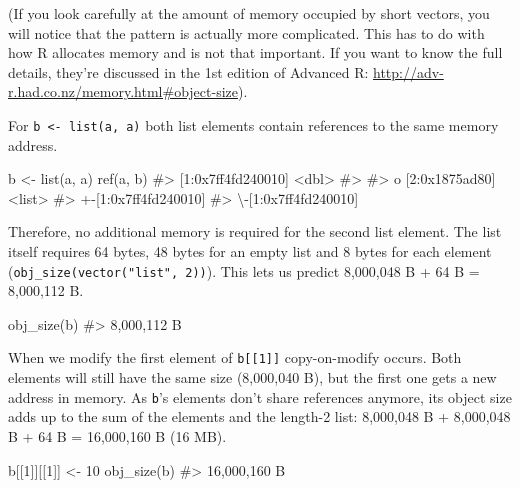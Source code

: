 \documentclass[
]{krantz}
\makeatletter
\newenvironment{Shaded}{\begin{snugshade}}{\end{snugshade}}
\newcommand{\CommentTok}[1]{\textcolor[rgb]{0.56,0.35,0.01}{\textit{#1}}}
\newcommand{\DecValTok}[1]{\textcolor[rgb]{0.00,0.00,0.81}{#1}}
\newcommand{\KeywordTok}[1]{\textcolor[rgb]{0.13,0.29,0.53}{\textbf{#1}}}
\newcommand{\NormalTok}[1]{#1}
\newcommand{\StringTok}[1]{\textcolor[rgb]{0.31,0.60,0.02}{#1}}
\newenvironment{kframe}{%
\medskip{}
\setlength{\fboxsep}{.8em}
 \def\at@end@of@kframe{}%
 \ifinner\ifhmode%
  \def\at@end@of@kframe{\end{minipage}}%
  \begin{minipage}{\columnwidth}%
 \fi\fi%
 \def\FrameCommand##1{\hskip\@totalleftmargin \hskip-\fboxsep
 \colorbox{shadecolor}{##1}\hskip-\fboxsep
     \hskip-\linewidth \hskip-\@totalleftmargin \hskip\columnwidth}%
 \MakeFramed {\advance\hsize-\width
   \@totalleftmargin\z@ \linewidth\hsize
   \@setminipage}}%
 {\par\unskip\endMakeFramed%
 \at@end@of@kframe}
\renewenvironment{Shaded}{\begin{kframe}}{\end{kframe}}
\renewcommand{\KeywordTok} [1]{\textcolor[rgb]{0.00,0.44,0.13}{{#1}}}
\renewcommand{\DecValTok}  [1]{\textcolor[rgb]{0.25,0.63,0.44}{{#1}}}
\renewcommand{\StringTok}  [1]{\textcolor[rgb]{0.25,0.44,0.63}{{#1}}}
\renewcommand{\CommentTok} [1]{\textcolor[rgb]{0.38,0.63,0.69}{{#1}}}
\renewcommand{\NormalTok}  [1]{{#1}}
\makeatother
\begin{document}
(If you look carefully at the amount of memory occupied by short vectors, you will notice that the pattern is actually more complicated. This has to do with how R allocates memory and is not that important. If you want to know the full details, they're discussed in the 1st edition of Advanced R: \url{http://adv-r.had.co.nz/memory.html\#object-size}).

For \texttt{b\ \textless{}-\ list(a,\ a)} both list elements contain references to the same memory address.

\begin{Shaded}
\begin{Highlighting}[]
\NormalTok{b <-}\StringTok{ }\KeywordTok{list}\NormalTok{(a, a)}
\KeywordTok{ref}\NormalTok{(a, b)}
\CommentTok{#> [1:0x7ff4fd240010] <dbl> }
\CommentTok{#>  }
\CommentTok{#> o [2:0x1875ad80] <list> }
\CommentTok{#> +-[1:0x7ff4fd240010] }
\CommentTok{#> \textbackslash{}-[1:0x7ff4fd240010]}
\end{Highlighting}
\end{Shaded}

Therefore, no additional memory is required for the second list element. The list itself requires 64 bytes, 48 bytes for an empty list and 8 bytes for each element (\texttt{obj\_size(vector("list",\ 2))}). This lets us predict 8,000,048 B + 64 B = 8,000,112 B.

\begin{Shaded}
\begin{Highlighting}[]
\KeywordTok{obj_size}\NormalTok{(b)}
\CommentTok{#> 8,000,112 B}
\end{Highlighting}
\end{Shaded}

When we modify the first element of \texttt{b{[}{[}1{]}{]}} copy-on-modify occurs. Both elements will still have the same size (8,000,040 B), but the first one gets a new address in memory. As \texttt{b}'s elements don't share references anymore, its object size adds up to the sum of the elements and the length-2 list: 8,000,048 B + 8,000,048 B + 64 B = 16,000,160 B (16 MB).

\begin{Shaded}
\begin{Highlighting}[]
\NormalTok{b[[}\DecValTok{1}\NormalTok{]][[}\DecValTok{1}\NormalTok{]] <-}\StringTok{ }\DecValTok{10}
\KeywordTok{obj_size}\NormalTok{(b)}
\CommentTok{#> 16,000,160 B}
\end{Highlighting}
\end{Shaded}
\end{document}
